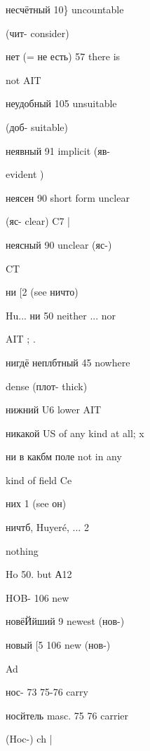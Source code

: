 \clearpage
\thispagestyle{plain}
\begingroup
\cyrillicfont
\fontsize{7.25}{8.25}\selectfont
\setlength{\parindent}{0pt}
\setlength{\parskip}{0pt}
\setlength{\emergencystretch}{1.5em}
\noindent
\begin{minipage}[t]{0.475\textwidth}
\raggedright
\noindent несчётный 10\} uncountable\par
\noindent (чит- consider)\par
\noindent нет (= не есть) 57 there is\par
\noindent not AIT\par
\noindent неудобный 105 unsuitable\par
\noindent (доб- suitable)\par
\noindent неявный 91 implicit (яв-\par
\noindent evident )\par
\noindent неясен 90 short form unclear\par
\noindent (яс- clear) C7 |\par
\noindent неясный 90 unclear (яс-)\par
\noindent CT\par
\noindent ни [2 (see ничто)\par
\noindent Hu... ни 50 neither ... nor\par
\noindent AIT ; .\par
\noindent нигдё неплбтный 45 nowhere\par
\noindent dense (плот- thick)\par
\noindent нижний U6 lower AIT\par
\noindent никакой US of any kind at all; x\par
\noindent ни в какбм поле not in any\par
\noindent kind of field Ce\par
\noindent них 1 (see он)\par
\noindent ничтб, Huyeré, ... 2\par
\noindent nothing\par
\noindent Ho 50. but А12\par
\noindent HOB- 106 new\par
\noindent новёЙйший 9 newest (нов-)\par
\noindent новый [5 106 new (нов-)\par
\noindent Ad\par
\noindent нос- 73 75-76 carry\par
\noindent носйтель masc. 75 76 carrier\par
\noindent (Hoc-) ch |\par

\end{minipage}
